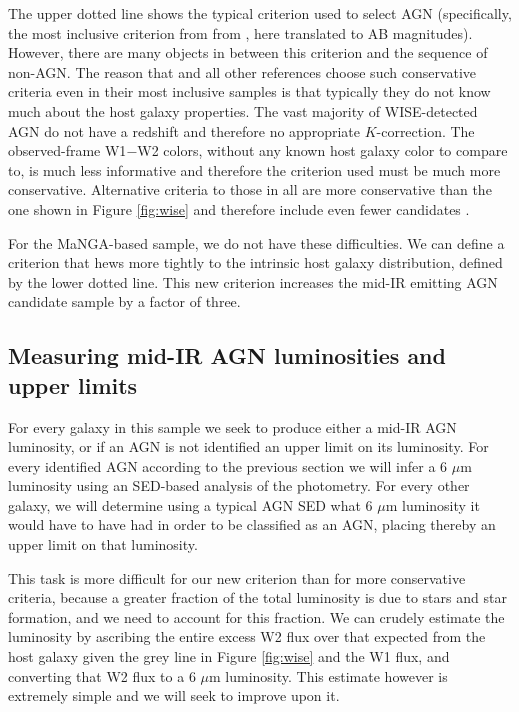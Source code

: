 \documentclass[12pt, preprint]{hacked-aastex}
\begin{document}
The upper dotted line shows the typical criterion used to select AGN
(specifically, the most inclusive criterion from from \cite{assef18a},
here translated to AB magnitudes). However, there are many objects in
between this criterion and the sequence of non-AGN. The reason that
\cite{assef18a} and all other references choose such conservative
criteria even in their most inclusive samples is that typically they
do not know much about the host galaxy properties.  The vast majority
of WISE-detected AGN do not have a redshift and therefore no
appropriate $K$-correction. The observed-frame W1$-$W2 colors, without
any known host galaxy color to compare to, is much less informative
and therefore the criterion used must be much more
conservative. Alternative criteria to those in \cite{assef18a} all are
more conservative than the one shown in Figure \ref{fig:wise} and
therefore include even fewer candidates \cite{jarrett11a,stern12a}.

For the MaNGA-based sample, we do not have these difficulties. We can
define a criterion that hews more tightly to the intrinsic host galaxy
distribution, defined by the lower dotted line. This new criterion
increases the mid-IR emitting AGN candidate sample by a factor of
three.

\subsection{Measuring mid-IR AGN luminosities and upper limits}
\label{sec:measurements}

For every galaxy in this sample we seek to produce either a mid-IR AGN
luminosity, or if an AGN is not identified an upper limit on its
luminosity.  For every identified AGN according to the previous
section we will infer a 6 $\mu$m luminosity using an SED-based
analysis of the photometry.  For every other galaxy, we will determine
using a typical AGN SED what 6 $\mu$m luminosity it would have to have
had in order to be classified as an AGN, placing thereby an upper
limit on that luminosity.

This task is more difficult for our new criterion than for more
conservative criteria, because a greater fraction of the total
luminosity is due to stars and star formation,
and we need to account for this fraction. We can crudely estimate the 
luminosity by ascribing the entire excess W2 flux over that expected 
from the host galaxy given the grey line in Figure \ref{fig:wise} and 
the W1 flux, and converting that W2 flux to a 6 $\mu$m luminosity. This
estimate however is extremely simple and we will seek to improve
upon it.
\end{document}
